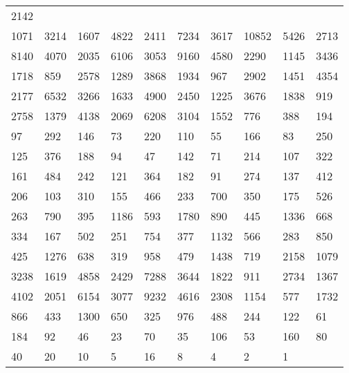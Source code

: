 \begin{longtable}{*{10}{l}}
2142&&&&&&&&&\\
1071& 3214& 1607& 4822& 2411& 7234& 3617& 10852& 5426& 2713\\
8140& 4070& 2035& 6106& 3053& 9160& 4580& 2290& 1145& 3436\\
1718& 859& 2578& 1289& 3868& 1934& 967& 2902& 1451& 4354\\
2177& 6532& 3266& 1633& 4900& 2450& 1225& 3676& 1838& 919\\
2758& 1379& 4138& 2069& 6208& 3104& 1552& 776& 388& 194\\
97& 292& 146& 73& 220& 110& 55& 166& 83& 250\\
125& 376& 188& 94& 47& 142& 71& 214& 107& 322\\
161& 484& 242& 121& 364& 182& 91& 274& 137& 412\\
206& 103& 310& 155& 466& 233& 700& 350& 175& 526\\
263& 790& 395& 1186& 593& 1780& 890& 445& 1336& 668\\
334& 167& 502& 251& 754& 377& 1132& 566& 283& 850\\
425& 1276& 638& 319& 958& 479& 1438& 719& 2158& 1079\\
3238& 1619& 4858& 2429& 7288& 3644& 1822& 911& 2734& 1367\\
4102& 2051& 6154& 3077& 9232& 4616& 2308& 1154& 577& 1732\\
866& 433& 1300& 650& 325& 976& 488& 244& 122& 61\\
184& 92& 46& 23& 70& 35& 106& 53& 160& 80\\
40& 20& 10& 5& 16& 8& 4& 2& 1& \\


\end{longtable}
